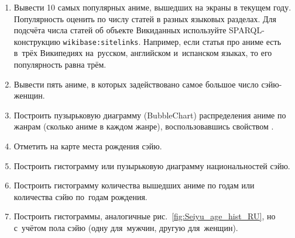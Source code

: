 \begin{enumerate}
    \item Вывести 10 самых популярных аниме, вышедших на экраны в текущем году. 
        Популярность оценить по числу статей в разных языковых разделах. 
        Для подсчёта числа статей об объекте Викиданных используйте SPARQL-конструкцию \lstinline|wikibase:sitelinks|. 
        Например, если статья про аниме есть в~трёх Википедиях на~русском, английском и~испанском языках, то его популярность равна трём. 
    \item Вывести пять аниме, в которых задействовано самое большое число сэйю-женщин.
    \item Построить пузырьковую диаграмму (BubbleChart) распределения аниме по жанрам (сколько аниме в каждом жанре), воспользовавшись свойством .
    \item Отметить на карте места рождения сэйю.
    \item Построить гистограмму или пузырьковую диаграмму национальностей сэйю.
    \item Построить гистограмму количества вышедших аниме по годам или количества сэйю по~годам рождения.
    \item Построить гистограммы, аналогичные рис.~\ref{fig:Seiyu_age_hist_RU}, 
        но с~учётом пола сэйю (одну для~мужчин, другую для~женщин).
\end{enumerate}
